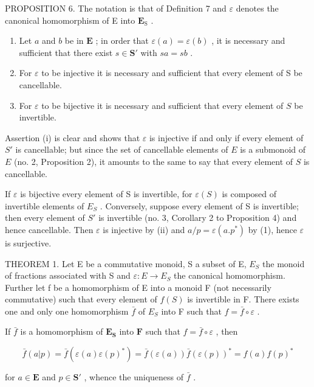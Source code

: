PROPOSITION 6. The notation is that of Definition 7 and \(\varepsilon\) denotes the canonical homomorphism of E into \(\mathbf{E}_{\mathrm{S}}\) .

\begin{enumerate}
\def\labelenumi{(\roman{enumi})}
\item
  Let \(a\) and \(b\) be in \(\mathbf{E}\) ; in order that \(\varepsilon(a) = \varepsilon(b)\) , it is necessary and sufficient that there exist \(s \in \mathbf{S}'\) with \(sa = sb\) .
\item
  For \(\varepsilon\) to be injective it is necessary and sufficient that every element of S be cancellable.
\item
  For \(\varepsilon\) to be bijective it is necessary and sufficient that every element of \(S\) be invertible.
\end{enumerate}

Assertion (i) is clear and shows that \(\varepsilon\) is injective if and only if every element of \(S'\) is cancellable; but since the set of cancellable elements of \(E\) is a submonoid of \(E\) (no. 2, Proposition 2), it amounts to the same to say that every element of \(S\) is cancellable.

If \(\varepsilon\) is bijective every element of S is invertible, for \(\varepsilon(S)\) is composed of invertible elements of \(E_{S}\) . Conversely, suppose every element of S is invertible; then every element of \(S'\) is invertible (no. 3, Corollary 2 to Proposition 4) and hence cancellable. Then \(\varepsilon\) is injective by (ii) and \(a/p = \varepsilon(a.p^{*})\) by (1), hence \(\varepsilon\) is surjective.

THEOREM 1. Let E be a commutative monoid, S a subset of E, \(E_{S}\) the monoid of fractions associated with S and \(\varepsilon: E \to E_{S}\) the canonical homomorphism. Further let f be a homomorphism of E into a monoid F (not necessarily commutative) such that every element of \(f(S)\) is invertible in F. There exists one and only one homomorphism \(\bar{f}\) of \(E_{S}\) into F such that \(f = \bar{f} \circ \varepsilon\) .

If \(\bar{f}\) is a homomorphism of \(\mathbf{E}_{\mathbf{S}}\) into \(\mathbf{F}\) such that \(f = \bar{f} \circ \varepsilon\) , then

\[
\bar {f} (a | p) = \bar {f} (\varepsilon (a) \varepsilon (p) ^ {*}) = \bar {f} (\varepsilon (a)) \bar {f} (\varepsilon (p)) ^ {*} = f (a) f (p) ^ {*}
\]

for \(a \in \mathbf{E}\) and \(p \in \mathbf{S}'\) , whence the uniqueness of \(\bar{f}\) .

